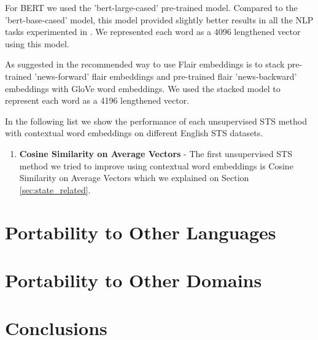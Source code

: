 For BERT we used the 'bert-large-cased' pre-trained model. Compared to the 'bert-base-cased' model, this model provided slightly better results in all the NLP tasks experimented in \citet{devlin-etal-2019-bert}. We represented each word as a 4096 lengthened vector using this model. 

As suggested in \citet{akbik-etal-2018-contextual} the recommended way to use Flair embeddings is to stack pre-trained 'news-forward' flair embeddings and pre-trained flair 'news-backward' embeddings with GloVe \cite{pennington-etal-2014-glove} word embeddings. We used the stacked model to represent each word as a 4196 lengthened vector. 

In the following list we show the performance of each unsupervised STS method with contextual word embeddings on different English STS datasets. 

\begin{enumerate}
	\item \textbf{Cosine Similarity on Average Vectors} - The first unsupervised STS method we tried to improve using contextual word embeddings is Cosine Similarity on Average Vectors which we explained on Section \ref{sec:state_related}.
\end{enumerate}







\section{Portability to Other Languages}
\label{sec:state_languages}

\section{Portability to Other Domains}
\label{sec:state_domains}

\section{Conclusions}